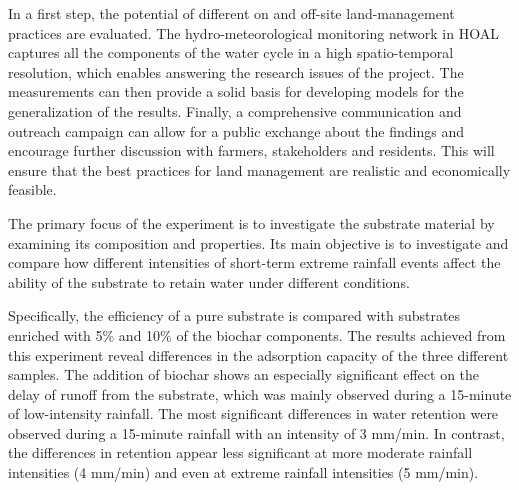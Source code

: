 In a first step, the potential of different on and off-site land-management practices are evaluated. The hydro-meteorological monitoring network in HOAL captures all the components of the water cycle in a high spatio-temporal resolution, which enables answering the research issues of the project. The measurements can then provide a solid basis for developing models for the generalization of the results. Finally, a comprehensive communication and outreach campaign can allow for a public exchange about the findings and encourage further discussion with farmers, stakeholders and residents. This will ensure that the best practices for land management are realistic and economically feasible.
\newpage{}
{}
\begin{flushleft}





\end{flushleft}

\noindent

The primary focus of the experiment is to investigate the substrate material by examining its composition and properties. Its main objective is to investigate and compare how different intensities of short-term extreme rainfall events affect the ability of the substrate to retain water under different conditions. 

Specifically, the efficiency of a pure substrate is compared with substrates enriched with 5\% and 10\% of the biochar components. The results achieved from this experiment reveal differences in the adsorption capacity of the three different samples. The addition of biochar shows an especially significant effect on the delay of runoff from the substrate, which was mainly observed during a 15-minute of low-intensity rainfall. The most significant differences in water retention were observed during a 15-minute rainfall with an intensity of 3 mm/min. In contrast, the differences in retention appear less significant at more moderate rainfall intensities (4 mm/min) and even at extreme rainfall intensities (5 mm/min). 

